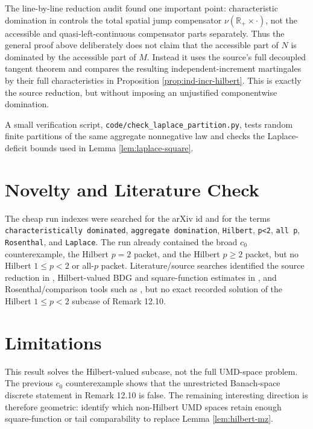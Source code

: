\documentclass[11pt]{article}
\begin{document}
The line-by-line reduction audit found one important point: characteristic
domination in \cite{Yaroslavtsev2019} controls the total spatial jump
compensator \(\nu(\mathbb R_+\times\cdot)\), not the accessible and
quasi-left-continuous compensator parts separately.  Thus the general proof
above deliberately does not claim that the accessible part of \(N\) is
dominated by the accessible part of \(M\).  Instead it uses the source's full
decoupled tangent theorem and compares the resulting independent-increment
martingales by their full characteristics in Proposition
\ref{prop:ind-incr-hilbert}.  This is exactly the source reduction, but
without imposing an unjustified componentwise domination.

A small verification script, \texttt{code/check\_laplace\_partition.py},
tests random finite partitions of the same aggregate nonnegative law and
checks the Laplace-deficit bounds used in Lemma \ref{lem:laplace-square}.

\section*{Novelty and Literature Check}

The cheap run indexes were searched for the arXiv id and for the terms
\texttt{characteristically dominated}, \texttt{aggregate domination},
\texttt{Hilbert}, \texttt{p<2}, \texttt{all p}, \texttt{Rosenthal}, and
\texttt{Laplace}.  The run already contained the broad \(c_0\) counterexample,
the Hilbert \(p=2\) packet, and the Hilbert \(p\geq2\) packet, but no Hilbert
\(1\leq p<2\) or all-\(p\) packet.  Literature/source searches identified the
source reduction in \cite{Yaroslavtsev2019}, Hilbert-valued BDG and
square-function estimates in \cite{Yaroslavtsev2018}, and Rosenthal/comparison
tools such as \cite{Pinelis2012,MontgomerySmithPruss2001}, but no exact
recorded solution of the Hilbert \(1\leq p<2\) subcase of Remark 12.10.

\section*{Limitations}

This result solves the Hilbert-valued subcase, not the full UMD-space problem.
The previous \(c_0\) counterexample shows that the unrestricted Banach-space
discrete statement in Remark 12.10 is false.  The remaining interesting
direction is therefore geometric: identify which non-Hilbert UMD spaces retain
enough square-function or tail comparability to replace Lemma
\ref{lem:hilbert-mz}.
\end{document}
